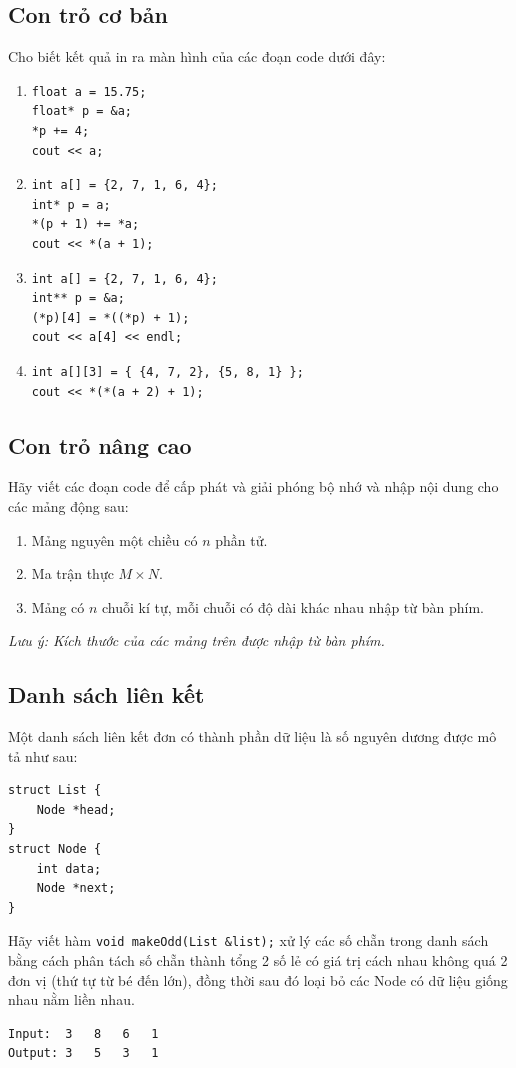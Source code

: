 \documentclass[main.tex]{subfiles}
\begin{document}
\subsection{Con trỏ cơ bản}
Cho biết kết quả in ra màn hình của các đoạn code dưới đây:
\begin{enumerate}
    \item \begin{verbatim}
float a = 15.75;
float* p = &a;
*p += 4;
cout << a;
\end{verbatim}
    \item \begin{verbatim}
int a[] = {2, 7, 1, 6, 4};
int* p = a;
*(p + 1) += *a;
cout << *(a + 1);
\end{verbatim}
    \item \begin{verbatim}
int a[] = {2, 7, 1, 6, 4};
int** p = &a;
(*p)[4] = *((*p) + 1);
cout << a[4] << endl;
\end{verbatim}
    \item \begin{verbatim}
int a[][3] = { {4, 7, 2}, {5, 8, 1} };
cout << *(*(a + 2) + 1);
\end{verbatim}
\end{enumerate}

\subsection{Con trỏ nâng cao}
Hãy viết các đoạn code để cấp phát và giải phóng bộ nhớ và nhập nội dung cho các mảng động sau:
\begin{enumerate}[label=\alph*.]
    \item Mảng nguyên một chiều có $n$ phần tử. 
    \item Ma trận thực $M\times N$.
    \item Mảng có $n$ chuỗi kí tự, mỗi chuỗi có độ dài khác nhau nhập từ bàn phím.
\end{enumerate}
\textit{Lưu ý: Kích thước của các mảng trên được nhập từ bàn phím.
}

\subsection{Danh sách liên kết}
Một danh sách liên kết đơn có thành phần dữ liệu là số nguyên dương được mô tả như sau:
\begin{verbatim}
struct List {
    Node *head;
}
struct Node {
    int data;
    Node *next;
}
\end{verbatim}
Hãy viết hàm \texttt{void makeOdd(List &list);} xử lý các số chẵn trong danh sách bằng cách phân tách số chẵn thành tổng 2 số lẻ có giá trị cách nhau không quá 2 đơn vị (thứ tự từ bé đến lớn), đồng thời sau đó loại bỏ các Node có dữ liệu giống nhau nằm liền nhau.
\begin{verbatim}
Input:  3   8   6   1
Output: 3   5   3   1
\end{verbatim}
\end{document}
